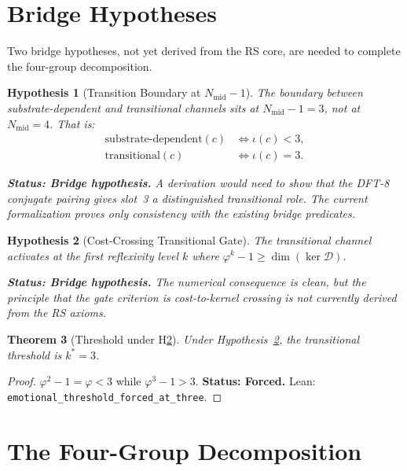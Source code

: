 \documentclass[11pt,a4paper]{article}
\newtheorem{theorem}{Theorem}[section]
\newtheorem{hypothesis}[theorem]{Hypothesis}
\theoremstyle{definition}
\newcommand{\phig}{\varphi}
\newcommand{\code}[1]{\texttt{\small #1}}
\newcommand{\forced}[1]{\noindent\textbf{Status: Forced.} #1}
\newcommand{\bridge}[1]{\noindent\textbf{Status: Bridge hypothesis.} #1}
\begin{document}
\section{Bridge Hypotheses}
\label{sec:bridge}

Two bridge hypotheses, not yet derived from the RS core, are needed to
complete the four-group decomposition.

\begin{hypothesis}[Transition Boundary at $N_{\mathrm{mid}}-1$]
\label{hyp:boundary}
The boundary between substrate-dependent and transitional channels
sits at $N_{\mathrm{mid}}-1 = 3$, not at $N_{\mathrm{mid}} = 4$.
That is:
\begin{align}
\mathrm{substrate\text{-}dependent}(c) &\iff \iota(c) < 3,\\
\mathrm{transitional}(c) &\iff \iota(c) = 3.
\end{align}

\bridge{A derivation would need to show that the DFT-8 conjugate
pairing gives slot~3 a distinguished transitional role. The current
formalization proves only consistency with the existing bridge
predicates.}
\end{hypothesis}

\begin{hypothesis}[Cost-Crossing Transitional Gate]
\label{hyp:gate}
The transitional channel activates at the first reflexivity level $k$
where $\phig^k - 1 \ge \dim(\ker\mathcal{D})$.

\bridge{The numerical consequence is clean, but the principle that the
gate criterion is cost-to-kernel crossing is not currently derived from
the RS axioms.}
\end{hypothesis}

\begin{theorem}[Threshold under H\ref{hyp:gate}]
\label{thm:threshold}
Under Hypothesis~\ref{hyp:gate}, the transitional threshold is $k^*=3$.
\end{theorem}

\begin{proof}
$\phig^2 - 1 = \phig < 3$ while $\phig^3 - 1 > 3$.
\forced{Lean: \code{emotional\_threshold\_forced\_at\_three}.}
\end{proof}

\section{The Four-Group Decomposition}
\label{sec:four}
\end{document}
